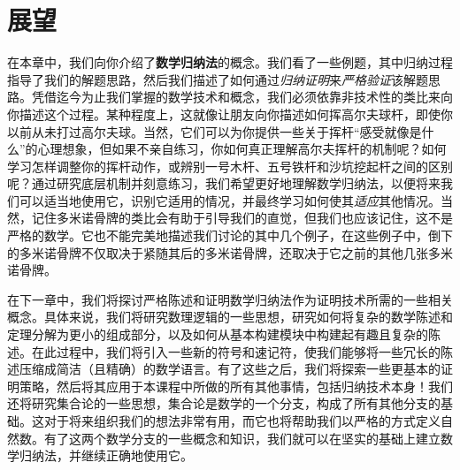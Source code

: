 \section{展望}

在本章中，我们向你介绍了\textbf{数学归纳法}的概念。我们看了一些例题，其中归纳过程指导了我们的解题思路，然后我们描述了如何通过\textit{归纳证明}来\textit{严格验证}该解题思路。凭借迄今为止我们掌握的数学技术和概念，我们必须依靠非技术性的类比来向你描述这个过程。某种程度上，这就像让朋友向你描述如何挥高尔夫球杆，即使你以前从未打过高尔夫球。当然，它们可以为你提供一些关于挥杆“感受就像是什么”的心理想象，但如果不亲自练习，你如何真正理解高尔夫挥杆的机制呢？如何学习怎样调整你的挥杆动作，或辨别一号木杆、五号铁杆和沙坑挖起杆之间的区别呢？通过研究底层机制并刻意练习，我们希望更好地理解数学归纳法，以便将来我们可以适当地使用它，识别它适用的情况，并最终学习如何使其\textit{适应}其他情况。当然，记住多米诺骨牌的类比会有助于引导我们的直觉，但我们也应该记住，这不是严格的数学。它也不能完美地描述我们讨论的其中几个例子，在这些例子中，倒下的多米诺骨牌不仅取决于紧随其后的多米诺骨牌，还取决于它之前的其他几张多米诺骨牌。

在下一章中，我们将探讨严格陈述和证明数学归纳法作为证明技术所需的一些相关概念。具体来说，我们将研究数理逻辑的一些思想，研究如何将复杂的数学陈述和定理分解为更小的组成部分，以及如何从基本构建模块中构建起有趣且复杂的陈述。在此过程中，我们将引入一些新的符号和速记符，使我们能够将一些冗长的陈述压缩成简洁（且精确）的数学语言。有了这些之后，我们将探索一些更基本的证明策略，然后将其应用于本课程中所做的所有其他事情，包括归纳技术本身！我们还将研究集合论的一些思想，集合论是数学的一个分支，构成了所有其他分支的基础。这对于将来组织我们的想法非常有用，而它也将帮助我们以严格的方式定义自然数。有了这两个数学分支的一些概念和知识，我们就可以在坚实的基础上建立数学归纳法，并继续正确地使用它。
